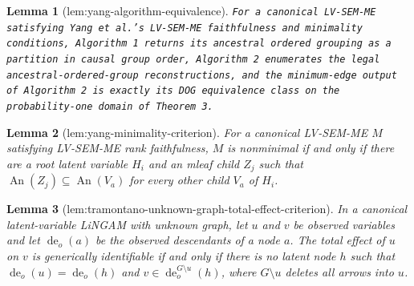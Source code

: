 \documentclass{article}
\newtheorem{lemma}{Lemma}
\begin{document}
\begin{lemma}[lem:yang-algorithm-equivalence]\label{lem:yang-algorithm-equivalence}
\texttt{For a canonical LV-\allowbreak{}SEM-\allowbreak{}ME satisfying Yang et al.'s LV-\allowbreak{}SEM-\allowbreak{}ME faithfulness and minimality conditions,\allowbreak{} Algorithm 1 returns its ancestral ordered grouping as a partition in causal group order,\allowbreak{} Algorithm 2 enumerates the legal ancestral-\allowbreak{}ordered-\allowbreak{}group reconstructions,\allowbreak{} and the minimum-\allowbreak{}edge output of Algorithm 2 is exactly its DOG equivalence class on the probability-\allowbreak{}one domain of Theorem 3.}
\end{lemma}

\begin{lemma}[lem:yang-minimality-criterion]\label{lem:yang-minimality-criterion}
For a canonical LV-SEM-ME \(M\) satisfying LV-SEM-ME rank faithfulness, \(M\) is nonminimal if and only if there are a root latent variable \(H_i\) and an mleaf child \(Z_j\) such that \(\operatorname{An}(Z_j)\subseteq\operatorname{An}(V_a)\) for every other child \(V_a\) of \(H_i\).
\end{lemma}

\begin{lemma}[lem:tramontano-unknown-graph-total-effect-criterion]\label{lem:tramontano-unknown-graph-total-effect-criterion}
In a canonical latent-variable LiNGAM with unknown graph, let \(u\) and \(v\) be observed variables and let \(\operatorname{de}_o(a)\) be the observed descendants of a node \(a\). The total effect of \(u\) on \(v\) is generically identifiable if and only if there is no latent node \(h\) such that \(\operatorname{de}_o(u)=\operatorname{de}_o(h)\) and \(v\in\operatorname{de}^{G\setminus u}_o(h)\), where \(G\setminus u\) deletes all arrows into \(u\).
\end{lemma}
\end{document}
